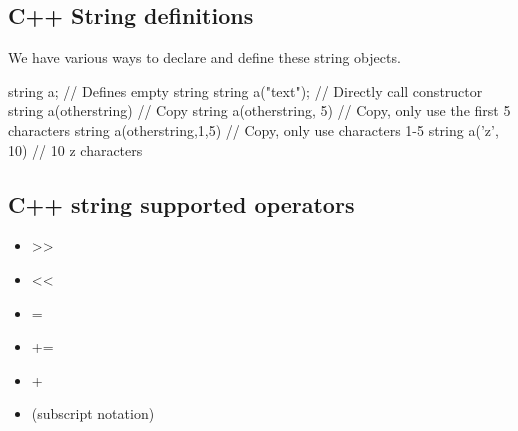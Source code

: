\documentclass{report}
\begin{document}
    \bigbreak \noindent 
    \subsection{C++ String definitions}
    \bigbreak \noindent 
    We have various ways to declare and define these string objects.
    \bigbreak \noindent 
    
    \begin{cppcode}
string a; // Defines empty string
string a("text"); // Directly call constructor
string a(otherstring) // Copy
string a(otherstring, 5) // Copy, only use the first 5 characters
string a(otherstring,1,5) // Copy, only use characters 1-5
string a('z', 10) // 10 z characters
    \end{cppcode}
    

    \bigbreak \noindent 
    \subsection{C++ string supported operators}
    \bigbreak \noindent 
    \begin{itemize}
        \item >>
        \item <<
        \item =
        \item +=
        \item +
        \item \relax [] (subscript notation)
    \end{itemize}
\end{document}
